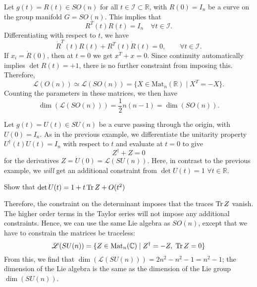 \begin{example}[G = SO(n)]
  Let $g(t) = R(t) \in SO(n)$ for all $t \in \mathcal{I} \subset \mathbb{R}$, with $R(0) = I_n$ be a curve on the group manifold $G = SO(n)$.
  This implies that
  \begin{equation}
    R^T(t) R(t) = I_n \quad \forall t \in \mathcal{I}.
  \end{equation}
  Differentiating with respect to $t$, we have
  \begin{equation}
    \dot R^T (t) R(t) + R^T(t) \dot R(t) = 0, \qquad \forall t \in \mathcal{I}.
  \end{equation}
  If $x_i = \dot R(0)$, then at $t =0$ we get $x^T + x = 0$.
  Since continuity automatically implies $\det R(t) = +1$, there is no further constraint from imposing this.
  Therefore,
  \begin{equation}
    \mathscr{L}(O(n)) \simeq \mathscr{L}(SO(n)) = \{ X \in \text{Mat}_n(\mathbb{R}) \mid X^T = -X \}.
  \end{equation}
  Counting the parameters in these matrices, we then have 
  \begin{equation}
    \dim(\mathscr{L}(SO(n))) = \frac{1}{2} n (n - 1) = \dim(SO(n)).
  \end{equation}
\end{example}

\begin{example}[G = SU(n)]
  Let $g(t) = U(t) \in SU(n)$ be a curve passing through the origin, with $U(0) = I_n$.
  As in the previous example, we differentiate the unitarity property $U^{\dagger}(t) U(t) = I_n$ with respect to $t$ and evaluate at $t = 0$ to give
  \begin{equation}
    Z^{\dagger} + Z = 0
  \end{equation}
  for the derivatives $Z = \dot U(0) = \mathscr{L}(SU(n))$.
  Here, in contrast to the previous example, we \emph{will} get an additional constraint from $\det U(t) = 1$ $\forall t \in \mathbb{R}$.

  \begin{exercise}
    Show that $\det U(t) = 1 + t \Tr Z + O(t^2)$
  \end{exercise}
  Therefore, the constraint on the determinant imposes that the traces $\Tr Z$ vanish.
  The higher order terms in the Taylor series will not impose any additional constraints.
  Hence, we can use the same Lie algebra as $SO(n)$, except that we have to constrain the matrices be traceless:
  \begin{equation}
    \mathscr{L}(SU(n)) = \{Z \in \text{Mat}_n(\mathbb{C}) \mid Z^{\dagger} = -Z, \; \Tr Z = 0\}
  \end{equation}
  From this, we find that $\dim(\mathscr{L} (SU(n))) = 2n^2 - n^2 - 1 = n^2 - 1$; the dimension of the Lie algebra is the same as the dimension of the Lie group $\dim(SU(n))$.
\end{example}

